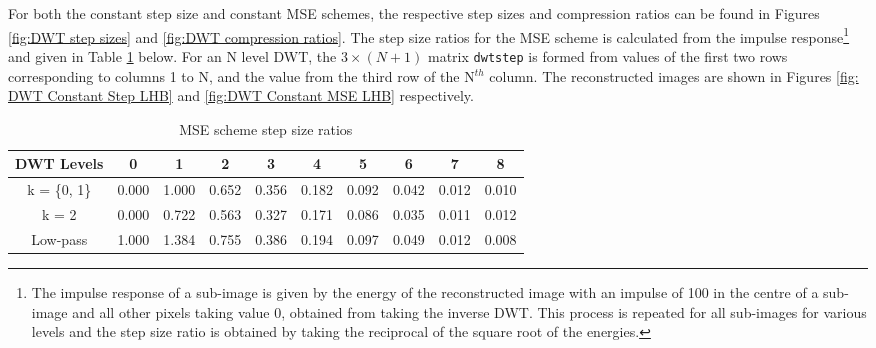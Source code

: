 For both the constant step size and constant MSE schemes, the respective step sizes and compression ratios can be found in Figures \ref{fig:DWT step sizes} and \ref{fig:DWT compression ratios}. The step size ratios for the MSE scheme is calculated from the impulse response\footnote{The impulse response of a sub-image is given by the energy of the reconstructed image with an impulse of 100 in the centre of a sub-image and all other pixels taking value 0, obtained from taking the inverse DWT. This process is repeated for all sub-images for various levels and the step size ratio is obtained by taking the reciprocal of the square root of the energies.} and given in Table \ref{table:MSE step size} below. For an N level DWT, the $3\times (N+1)$ matrix \texttt{dwtstep} is formed from values of the first two rows corresponding to columns 1 to N, and the value from the third row of the N$^{th}$ column. The reconstructed images are shown in Figures \ref{fig: DWT Constant Step LHB} and \ref{fig:DWT Constant MSE LHB} respectively.\\
\vspace{-2mm}

\begin{table}[h]
\centering
\begin{tabular}{|c|c|c|c|c|c|c|c|c|c|}
\hline
DWT Levels & 0 & 1 & 2 & 3 & 4 & 5 & 6 & 7 & 8\\
\hline
k = \{0, 1\} & 0.000 & 1.000 & 0.652 & 0.356 & 0.182 & 0.092 & 0.042 & 0.012 & 0.010\\
\hline
k = 2 & 0.000 & 0.722 & 0.563 & 0.327 & 0.171 & 0.086 & 0.035 & 0.011 & 0.012\\
\hline
Low-pass & 1.000 & 1.384 & 0.755 & 0.386 & 0.194 & 0.097 & 0.049 & 0.012 & 0.008\\
\hline
\end{tabular}
\caption{MSE scheme step size ratios}
\label{table:MSE step size}
\vspace{-0.4cm}
\end{table}

